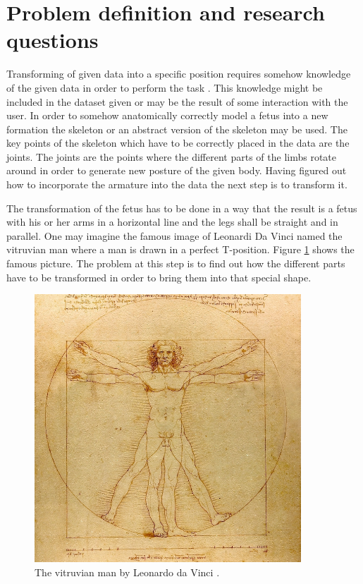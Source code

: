 \section{Problem definition and research questions}

Transforming of given data into a specific position requires somehow knowledge of the given data in order to perform the task \cite{Singh2004}. This knowledge might be included in the dataset given or may be the result of some interaction with the user. In order to somehow anatomically correctly model a fetus into a new formation the skeleton or an abstract version of the skeleton may be used. The key points of the skeleton which have to be correctly placed in the data are the joints. The joints are the points where the different parts of the limbs rotate around in order to generate new posture of the given body. Having figured out how to incorporate the armature into the data the next step is to transform it.\newline

The transformation of the fetus has to be done in a way that the result is a fetus with his or her arms in a horizontal line and the legs shall be straight and in parallel. One may imagine the famous image of Leonardi Da Vinci named the vitruvian man where a man is drawn in a perfect T-position. Figure \ref{fig:vitruvianMan} shows the famous picture. The problem at this step is to find out how the different parts have to be transformed in order to bring them into that special shape. 

\begin{figure} [!htb]
    \centering
	\includegraphics[width=10cm]{content/images/vetruvianMan.png}
	\caption{The vitruvian man by Leonardo da Vinci \cite{daVinci1492TheMan}.} 
	\label{fig:vitruvianMan}
\end{figure}


